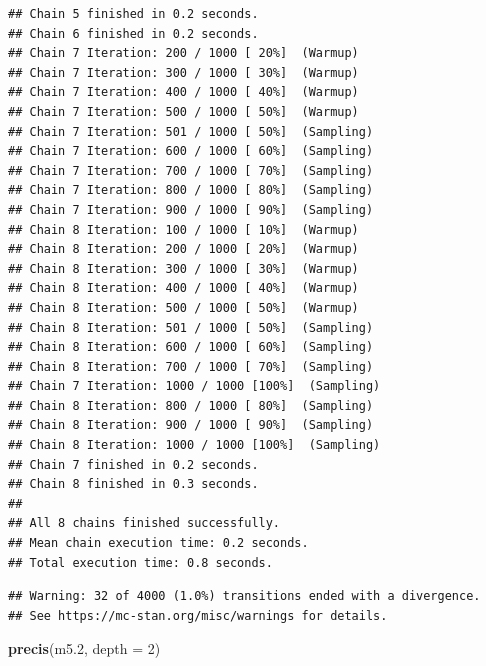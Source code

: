 \documentclass[
]{article}
\newenvironment{Shaded}{\begin{snugshade}}{\end{snugshade}}
\newcommand{\AttributeTok}[1]{\textcolor[rgb]{0.13,0.29,0.53}{#1}}
\newcommand{\DecValTok}[1]{\textcolor[rgb]{0.00,0.00,0.81}{#1}}
\newcommand{\FloatTok}[1]{\textcolor[rgb]{0.00,0.00,0.81}{#1}}
\newcommand{\FunctionTok}[1]{\textcolor[rgb]{0.13,0.29,0.53}{\textbf{#1}}}
\newcommand{\NormalTok}[1]{#1}
\begin{document}
\begin{verbatim}
## Chain 5 finished in 0.2 seconds.
## Chain 6 finished in 0.2 seconds.
## Chain 7 Iteration: 200 / 1000 [ 20%]  (Warmup) 
## Chain 7 Iteration: 300 / 1000 [ 30%]  (Warmup) 
## Chain 7 Iteration: 400 / 1000 [ 40%]  (Warmup) 
## Chain 7 Iteration: 500 / 1000 [ 50%]  (Warmup) 
## Chain 7 Iteration: 501 / 1000 [ 50%]  (Sampling) 
## Chain 7 Iteration: 600 / 1000 [ 60%]  (Sampling) 
## Chain 7 Iteration: 700 / 1000 [ 70%]  (Sampling) 
## Chain 7 Iteration: 800 / 1000 [ 80%]  (Sampling) 
## Chain 7 Iteration: 900 / 1000 [ 90%]  (Sampling) 
## Chain 8 Iteration: 100 / 1000 [ 10%]  (Warmup) 
## Chain 8 Iteration: 200 / 1000 [ 20%]  (Warmup) 
## Chain 8 Iteration: 300 / 1000 [ 30%]  (Warmup) 
## Chain 8 Iteration: 400 / 1000 [ 40%]  (Warmup) 
## Chain 8 Iteration: 500 / 1000 [ 50%]  (Warmup) 
## Chain 8 Iteration: 501 / 1000 [ 50%]  (Sampling) 
## Chain 8 Iteration: 600 / 1000 [ 60%]  (Sampling) 
## Chain 8 Iteration: 700 / 1000 [ 70%]  (Sampling) 
## Chain 7 Iteration: 1000 / 1000 [100%]  (Sampling) 
## Chain 8 Iteration: 800 / 1000 [ 80%]  (Sampling) 
## Chain 8 Iteration: 900 / 1000 [ 90%]  (Sampling) 
## Chain 8 Iteration: 1000 / 1000 [100%]  (Sampling) 
## Chain 7 finished in 0.2 seconds.
## Chain 8 finished in 0.3 seconds.
## 
## All 8 chains finished successfully.
## Mean chain execution time: 0.2 seconds.
## Total execution time: 0.8 seconds.
\end{verbatim}

\begin{verbatim}
## Warning: 32 of 4000 (1.0%) transitions ended with a divergence.
## See https://mc-stan.org/misc/warnings for details.
\end{verbatim}

\begin{Shaded}
\begin{Highlighting}[]
\FunctionTok{precis}\NormalTok{(m5}\FloatTok{.2}\NormalTok{, }\AttributeTok{depth =} \DecValTok{2}\NormalTok{)}
\end{Highlighting}
\end{Shaded}
\end{document}
